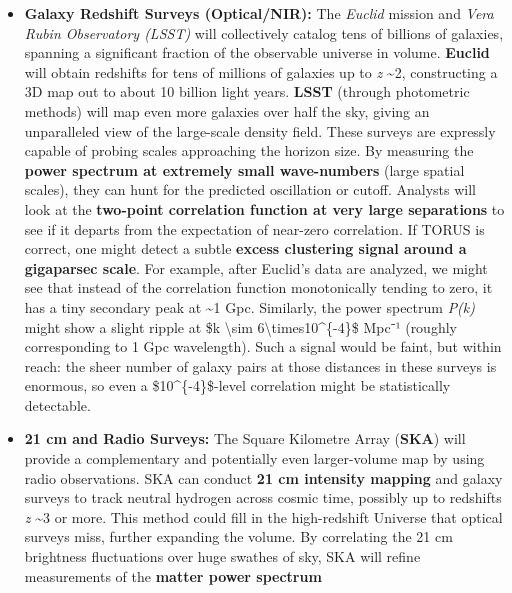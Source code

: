 \documentclass[
]{article}
\begin{document}
\begin{itemize}
\item
  \textbf{Galaxy Redshift Surveys (Optical/NIR):} The \emph{Euclid}
  mission and \emph{Vera Rubin Observatory (LSST)} will collectively
  catalog tens of billions of galaxies, spanning a significant fraction
  of the observable universe in volume. \textbf{Euclid} will obtain
  redshifts for tens of millions of galaxies up to \emph{z}
  \textasciitilde2, constructing a 3D map out to about 10 billion light
  years. \textbf{LSST} (through photometric methods) will map even more
  galaxies over half the sky, giving an unparalleled view of the
  large-scale density field. These surveys are expressly capable of
  probing scales approaching the horizon size. By measuring the
  \textbf{power spectrum at extremely small wave-numbers} (large spatial
  scales), they can hunt for the predicted oscillation or cutoff.
  Analysts will look at the \textbf{two-point correlation function at
  very large separations} to see if it departs from the \LambdaCDM expectation
  of near-zero correlation\hspace{0pt}. If TORUS is correct, one might
  detect a subtle \textbf{excess clustering signal around a gigaparsec
  scale}\hspace{0pt}. For example, after Euclid's data are analyzed, we
  might see that instead of the correlation function monotonically
  tending to zero, it has a tiny secondary peak at \textasciitilde1 Gpc.
  Similarly, the power spectrum \emph{P(k)} might show a slight ripple
  at \$k \textbackslash sim 6\textbackslash times10\^{}\{-4\}\$ Mpc⁻¹
  (roughly corresponding to 1 Gpc wavelength). Such a signal would be
  faint, but within reach: the sheer number of galaxy pairs at those
  distances in these surveys is enormous, so even a
  \$10\^{}\{-4\}\$-level correlation might be statistically
  detectable\hspace{0pt}.
\item
  \textbf{21 cm and Radio Surveys:} The Square Kilometre Array
  (\textbf{SKA}) will provide a complementary and potentially even
  larger-volume map by using radio observations. SKA can conduct
  \textbf{21 cm intensity mapping} and galaxy surveys to track neutral
  hydrogen across cosmic time, possibly up to redshifts \emph{z}
  \textasciitilde3 or more. This method could fill in the high-redshift
  Universe that optical surveys miss, further expanding the volume. By
  correlating the 21 cm brightness fluctuations over huge swathes of
  sky, SKA will refine measurements of the \textbf{matter power spectrum
}
\end{itemize}
\end{document}
